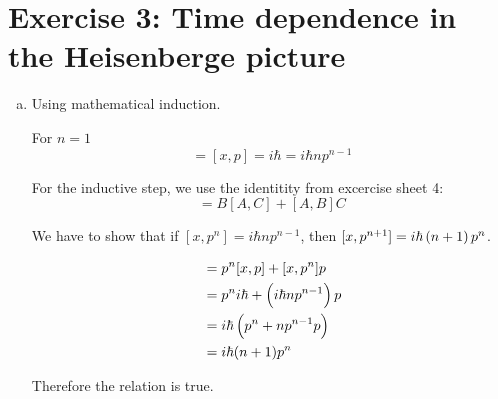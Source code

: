 \documentclass[a4paper,german,12pt,smallheadings]{scrartcl}
\begin{document}
\section*{Exercise 3: Time dependence in the Heisenberge picture}
\begin{enumerate}[a)]
  \item
    Using mathematical induction.

    For $n=1$
    \begin{equation*}
      [x,p^n] = [x,p] = i \hbar = i \hbar n p^{n-1}
    \end{equation*}

    For the inductive step, we use the identitity from excercise sheet 4:
    \begin{equation*}
      [A,BC] = B[A,C] + [A,B]C
    \end{equation*}

    We have to show that if $[x,p^n] = i \hbar n p^{n-1}$, then $[x,p^{n+1}] =
    i \hbar \del{n+1} p^n$.

    \begin{align*}
      [x,p^{n+1}] &= p^n[x,p] + [x,p^n]p \\
                  &= p^n i \hbar + \del{i \hbar n p^{n-1}} p \\
                  &= i \hbar \del{p^n + n p^{n-1} p} \\
                  &= i \hbar (n+1) p^n
    \end{align*}

    Therefore the relation is true.
\end{enumerate}
\end{document}
